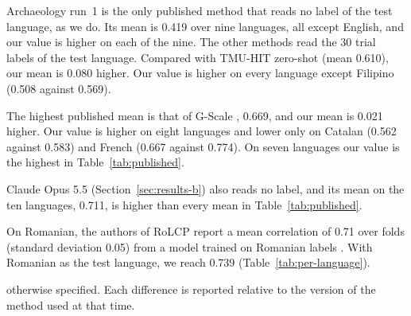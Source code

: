 \documentclass[11pt]{article}
\begin{document}
Archaeology run~1 is the only published method that reads no label of the test language, as we do. %
Its mean is 0.419 over nine languages, all except English, and our value is higher on each of the
nine. The other methods read the 30 trial labels of the test language. Compared with TMU-HIT
zero-shot \citep{enomoto-etal-2024-tmu} (mean 0.610), our mean is 0.080 higher. Our value is higher %
on every language except Filipino (0.508 against 0.569). %

The highest published mean is that of G-Scale \citep{nohejl-etal-2025-japanese}, 0.669, and our mean
is 0.021 higher. Our value is higher on eight languages and lower only on Catalan (0.562 against %
0.583) and French (0.667 against 0.774). On seven languages our value is the highest in %
Table~\ref{tab:published}.

Claude Opus 5.5 (Section~\ref{sec:results-b}) also reads no label, and its mean on the ten
languages, 0.711, is higher than every mean in Table~\ref{tab:published}. %

On Romanian, the authors of RoLCP report a mean correlation of 0.71 over folds (standard deviation
0.05) from a model trained on Romanian labels \citep{anghel-etal-2025-rals}. With Romanian as the %
test language, we reach 0.739 (Table~\ref{tab:per-language}). %


otherwise specified. Each difference is reported relative to the version of the method used at that
time.
\end{document}
